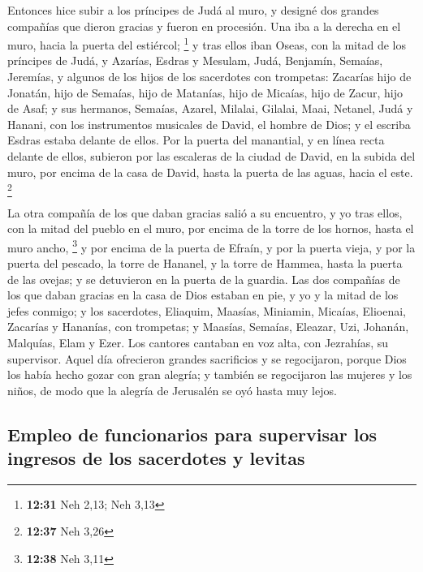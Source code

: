 \begin{paracol}{2}
 Entonces hice subir a los príncipes de Judá al muro, y
designé dos grandes compañías que dieron gracias y fueron en procesión.
Una iba a la derecha en el muro, hacia la puerta del estiércol;
\footnote{\textbf{12:31} Neh 2,13; Neh 3,13}  y tras
ellos iban Oseas, con la mitad de los príncipes de Judá, 
y Azarías, Esdras y Mesulam,  Judá, Benjamín, Semaías,
Jeremías,  y algunos de los hijos de los sacerdotes con
trompetas: Zacarías hijo de Jonatán, hijo de Semaías, hijo de Matanías,
hijo de Micaías, hijo de Zacur, hijo de Asaf;  y sus
hermanos, Semaías, Azarel, Milalai, Gilalai, Maai, Netanel, Judá y
Hanani, con los instrumentos musicales de David, el hombre de Dios; y el
escriba Esdras estaba delante de ellos.  Por la puerta
del manantial, y en línea recta delante de ellos, subieron por las
escaleras de la ciudad de David, en la subida del muro, por encima de la
casa de David, hasta la puerta de las aguas, hacia el este. \footnote{\textbf{12:37}
  Neh 3,26}

 La otra compañía de los que daban gracias salió a su
encuentro, y yo tras ellos, con la mitad del pueblo en el muro, por
encima de la torre de los hornos, hasta el muro ancho, \footnote{\textbf{12:38}
  Neh 3,11}  y por encima de la puerta de Efraín, y por
la puerta vieja, y por la puerta del pescado, la torre de Hananel, y la
torre de Hammea, hasta la puerta de las ovejas; y se detuvieron en la
puerta de la guardia.  Las dos compañías de los que daban
gracias en la casa de Dios estaban en pie, y yo y la mitad de los jefes
conmigo;  y los sacerdotes, Eliaquim, Maasías, Miniamin,
Micaías, Elioenai, Zacarías y Hananías, con trompetas;  y
Maasías, Semaías, Eleazar, Uzi, Johanán, Malquías, Elam y Ezer. Los
cantores cantaban en voz alta, con Jezrahías, su supervisor.
 Aquel día ofrecieron grandes sacrificios y se
regocijaron, porque Dios los había hecho gozar con gran alegría; y
también se regocijaron las mujeres y los niños, de modo que la alegría
de Jerusalén se oyó hasta muy lejos.

\hypertarget{empleo-de-funcionarios-para-supervisar-los-ingresos-de-los-sacerdotes-y-levitas}{%
\subsection{Empleo de funcionarios para supervisar los ingresos de los
sacerdotes y
levitas}\label{empleo-de-funcionarios-para-supervisar-los-ingresos-de-los-sacerdotes-y-levitas}}


\end{paracol}
